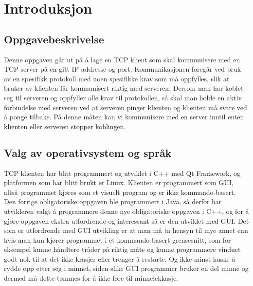 \section{Introduksjon}
\subsection{Oppgavebeskrivelse}
Denne oppgaven går ut på å lage en TCP klient som skal kommunisere med en TCP server på en gitt IP addresse og port. Kommunikasjonen foregår ved bruk av en spesifikk protokoll med noen spesifikke krav som må oppfylles, slik at bruker av klienten får kommunisert riktig med serveren. Dersom man har koblet seg til serveren og oppfyller alle krav til protokollen, så skal man holde en aktiv forbindelse med serveren ved at serveren pinger klienten og klienten må svare ved å ponge tilbake. På denne måten kan vi kommunisere med en server inntil enten klienten eller serveren stopper koblingen.

\subsection{Valg av operativsystem og språk}
TCP klienten har blitt programmert og utviklet i C++ med Qt Framework, og platformen som har blitt brukt er Linux. Klienten er programmert som GUI, altså programmet kjøres som et visuelt program og er ikke kommando-basert. Den forrige obligatoriske oppgaven ble programmert i Java, så derfor har utvikleren valgt å programmere denne nye obligatoriske oppgaven i C++, og for å gjøre oppgaven ekstra utfordrende og interessant så er den utviklet med GUI. Det som er utfordrende med GUI utvikling er at man må ta hensyn til mye annet enn hvis man kun kjører programmet i et kommando-basert grensesnitt, som for eksempel kunne håndtere tråder på riktig måte og kunne programmere vinduet godt nok til at det ikke krasjer eller trenger å restarte. Og ikke minst huske å rydde opp etter seg i minnet, siden slike GUI programmer bruker en del minne og dermed må dette tømmes for å ikke føre til minnelekkasje.
